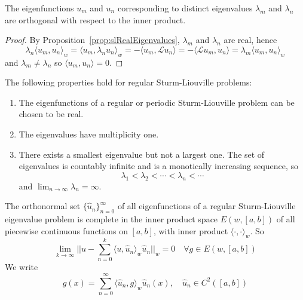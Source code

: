 \begin{proposition}
	The eigenfunctions $u_m$ and $u_n$ corresponding to distinct eigenvalues $\lambda_m$ and $\lambda_n$ are orthogonal with respect to the inner product.
\end{proposition}

\begin{proof}
	By Proposition~\ref{prop:slRealEigenvalues}, $\lambda_m$ and $\lambda_n$ are real, hence
	\[
		\lambda_n {\langle u_m, u_n \rangle}_w = {\langle u_m, \lambda_n u_n \rangle}_w = -\langle u_m, \mathcal{L} u_n \rangle = -\langle \mathcal{L} u_m, u_n \rangle = \lambda_m {\langle u_m, u_n \rangle}_w
	\]
	and $\lambda_m \ne \lambda_n$ so $\langle u_m, u_n \rangle = 0$.
\end{proof}

\begin{proposition}
	The following properties hold for regular Sturm-Liouville problems:
	\begin{enumerate}
		\item The eigenfunctions of a regular or periodic Sturm-Liouville problem can be chosen to be real.
		\item The eigenvalues have multiplicity one.
		\item There exists a smallest eigenvalue but not a largest one. The set of eigenvalues is countably infinite and is a monotically increasing sequence, so
		\[
			\lambda_1 < \lambda_2 < \cdots < \lambda_n < \cdots
		\]
		and $\lim_{n \to \infty} \lambda_n = \infty$.
	\end{enumerate}
\end{proposition}

\begin{proposition}
	The orthonormal set $\{ \hat{u}_n \}_{n = 0}^{\infty}$ of all eigenfunctions of a regular Sturm-Liouville eigenvalue problem is complete in the inner product space $E(w, [a, b])$ of all piecewise continuous functions on $[a, b]$, with inner product ${\langle \cdot, \cdot \rangle}_w$. So
	\[
		\lim_{k \to \infty} ||u - \sum_{n = 0}^k {\langle u, \hat{u}_n \rangle}_w \hat{u}_n||_w = 0 \quad \forall g \in E(w, [a, b])
	\]
	We write
	\[
		g(x) = \sum_{n = 0}^{\infty} {\langle \hat{u}_n, g \rangle}_w \hat{u}_n(x), \quad \hat{u}_n \in C^2([a, b])
	\]
\end{proposition}

